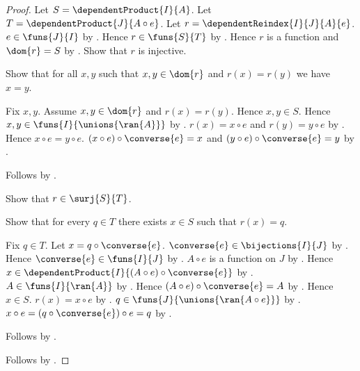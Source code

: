 \begin{proof}
    Let $S=\dependentProduct{I}{A}$.
    Let $T=\dependentProduct{J}{A\circ e}$.
    Let $r=\dependentReindex{I}{J}{A}{e}$.
    $e\in\funs{J}{I}$ by .
    Hence $r\in\funs{S}{T}$ by .
    Hence $r$ is a function and $\dom{r}=S$ by
        .
    Show that $r$ is injective.
    \begin{subproof}
        Show that for all $x,y$ such that $x,y\in\dom{r}$ and
            $r(x)=r(y)$ we have $x=y$.
        \begin{subproof}
            Fix $x,y$.
            Assume $x,y\in\dom{r}$ and $r(x)=r(y)$.
            Hence $x,y\in S$.
            Hence $x,y\in\funs{I}{\unions{\ran{A}}}$ by
                .
            $r(x)=x\circ e$ and $r(y)=y\circ e$ by
                .
            Hence $x\circ e=y\circ e$.
            $(x\circ e)\circ\converse{e}=x$ and
                $(y\circ e)\circ\converse{e}=y$ by
                .
        \end{subproof}
        Follows by .
    \end{subproof}
    Show that $r\in\surj{S}{T}$.
    \begin{subproof}
        Show that for every $q\in T$ there exists $x\in S$ such that
            $r(x)=q$.
        \begin{subproof}
            Fix $q\in T$.
            Let $x=q\circ\converse{e}$.
            $\converse{e}\in\bijections{I}{J}$ by
                .
            Hence $\converse{e}\in\funs{I}{J}$ by
                .
            $A\circ e$ is a function on $J$ by
                .
            Hence $x\in\dependentProduct{I}{(A\circ e)\circ
                \converse{e}}$ by
                .
            $A\in\funs{I}{\ran{A}}$ by
                .
            Hence $(A\circ e)\circ\converse{e}=A$ by
                .
            Hence $x\in S$.
            $r(x)=x\circ e$ by .
            $q\in\funs{J}{\unions{\ran{A\circ e}}}$ by
                .
            $x\circ e=(q\circ\converse{e})\circ e=q$ by
                .
        \end{subproof}
        Follows by .
    \end{subproof}
    Follows by .
\end{proof}

